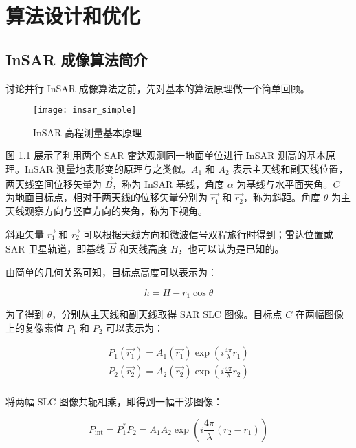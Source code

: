 \chapter{算法设计和优化}

\section{InSAR 成像算法简介}

讨论并行 InSAR 成像算法之前，先对基本的算法原理做一个简单回顾。

\begin{figure}[ht]
\centering
\texttt{[image: insar\_simple]}
\caption{InSAR 高程测量基本原理} \label{fig:insar_simple}
\end{figure}

图 \ref{fig:insar_simple} 展示了利用两个 SAR 雷达观测同一地面单位进行 InSAR 测高的基本原理。InSAR 测量地表形变的原理与之类似。$A_1$ 和 $A_2$ 表示主天线和副天线位置，两天线空间位移矢量为 $\vec{B}$，称为 InSAR 基线，角度 $\alpha$ 为基线与水平面夹角。$C$ 为地面目标点，相对于两天线的位移矢量分别为 $\vec{r_1}$ 和 $\vec{r_2}$，称为斜距。角度 $\theta$ 为主天线观察方向与竖直方向的夹角，称为下视角。

斜距矢量 $ \vec{r_1} $ 和 $ \vec{r_2} $ 可以根据天线方向和微波信号双程旅行时得到；雷达位置或 SAR 卫星轨道，即基线 $\vec{B}$ 和天线高度 $H$，也可以认为是已知的。

由简单的几何关系可知，目标点高度可以表示为：

\begin{equation}
    h = H - r_1 \cos\theta
\end{equation}

为了得到 $\theta$，分别从主天线和副天线取得 SAR SLC 图像。目标点 $C$ 在两幅图像上的复像素值 $P_1$ 和 $P_2$ 可以表示为：

\begin{equation}
\begin{split}
    P_1(\vec{r_1}) = A_1(\vec{r_1}) \exp(i \frac{4\pi}{\lambda} r_1) \\
    P_2(\vec{r_2}) = A_2(\vec{r_2}) \exp(i \frac{4\pi}{\lambda} r_2) \\
\end{split}
\end{equation}

将两幅 SLC 图像共轭相乘，即得到一幅干涉图像：

\begin{equation}
    P_{\textrm{int}} = P_1^* P_2 =  A_1 A_2 \exp(i \frac{4\pi}{\lambda}(r_2 - r_1))
\end{equation}

